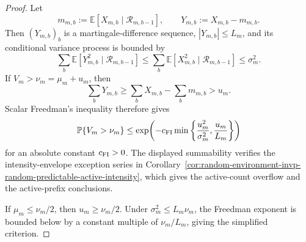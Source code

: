 \documentclass[11pt]{amsart}
\numberwithin{equation}{section}
\theoremstyle{definition}
\theoremstyle{remark}
\newcommand{\Prob}{\mathbb P}
\newcommand{\Exp}{\mathbb E}
\begin{document}
\begin{proof}
Let
\[
  m_{m,b}:=\Exp[X_{m,b}\mid\mathcal R_{m,b-1}],
  \qquad
  Y_{m,b}:=X_{m,b}-m_{m,b}.
\]
Then \((Y_{m,b})_b\) is a martingale-difference sequence, \(|Y_{m,b}|\le L_m\),
and its conditional variance process is bounded by
\[
  \sum_b\Exp[Y_{m,b}^2\mid\mathcal R_{m,b-1}]
  \le
  \sum_b\Exp[X_{m,b}^2\mid\mathcal R_{m,b-1}]
  \le \sigma_m^2 .
\]
If \(V_m>\nu_m=\mu_m+u_m\), then
\[
  \sum_b Y_{m,b}
  \ge
  \sum_b X_{m,b}-\sum_b m_{m,b}
  > u_m .
\]
Scalar Freedman's inequality therefore gives
\[
  \Prob\{V_m>\nu_m\}
  \le
  \exp\!\left(
    -c_{\rm FI}\min\left\{\frac{u_m^2}{\sigma_m^2},
                          \frac{u_m}{L_m}\right\}
  \right)
\]
for an absolute constant \(c_{\rm FI}>0\).  The displayed summability verifies
the intensity-envelope exception series in
Corollary~\ref{cor:random-environment-invp-random-predictable-active-intensity},
which gives the active-count overflow and the active-prefix conclusions.

If \(\mu_m\le\nu_m/2\), then \(u_m\ge\nu_m/2\).  Under
\(\sigma_m^2\le L_m\nu_m\), the Freedman exponent is bounded below by a
constant multiple of \(\nu_m/L_m\), giving the simplified criterion.
\end{proof}
\end{document}
